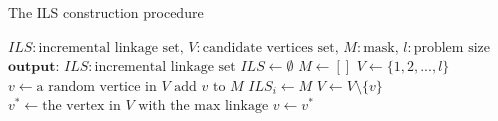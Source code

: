 \begin{algorithm}
	\caption{The ILS construction procedure}
	\label{alg:ILS}
	\begin{algorithmic}[1]
		\State $ILS: \text{incremental linkage set, } V: \text{candidate vertices set,}$
		\State $M: \text{mask, } l: \text{problem size}$
		\State $\textbf{output: } ILS: \text{incremental linkage set}$
		\State $ILS \gets \emptyset$
		\State $M \gets []$
		\State $V \gets \{1, 2, ..., l\}$
		\State $v \gets \text{a random vertice in } V$
			\State $\text{add $v$ to $M$}$
			\State $ILS_i \gets M$
			\State $V \gets V \setminus \{v\}$
			\State $v^* \gets \text{the vertex in $V$ with the max linkage}$
			\State $v \gets v^*$
		\EndFor
	\end{algorithmic}
\end{algorithm}

